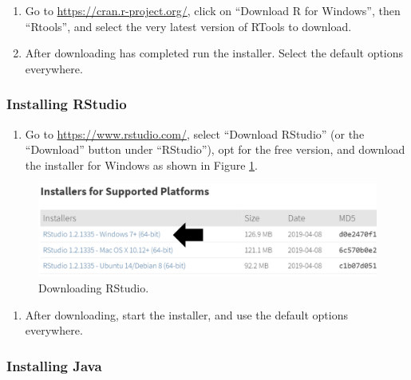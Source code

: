 \documentclass[11pt]{book}
\providecommand{\tightlist}{%
  \setlength{\itemsep}{0pt}\setlength{\parskip}{0pt}}
\theoremstyle{definition}
\theoremstyle{definition}
\theoremstyle{definition}
\theoremstyle{remark}
\begin{document}
\begin{enumerate}
\def\labelenumi{\arabic{enumi}.}
\item
  Go to \url{https://cran.r-project.org/}, click on ``Download R for
  Windows'', then ``Rtools'', and select the very latest version of
  RTools to download.
\item
  After downloading has completed run the installer. Select the default
  options everywhere.
\end{enumerate}

\subsubsection*{Installing RStudio}\label{installing-rstudio}

\begin{enumerate}
\def\labelenumi{\arabic{enumi}.}
\tightlist
\item
  Go to \url{https://www.rstudio.com/}, select ``Download RStudio'' (or
  the ``Download'' button under ``RStudio''), opt for the free version,
  and download the installer for Windows as shown in Figure
  \ref{fig:downloadRStudio}.
\end{enumerate}

\begin{figure}

{\centering \includegraphics[width=1\linewidth]{images/OhdsiAnalyticsTools/downloadRStudio} 

}

\caption{Downloading RStudio.}\label{fig:downloadRStudio}
\end{figure}

\begin{enumerate}
\def\labelenumi{\arabic{enumi}.}
\setcounter{enumi}{1}
\tightlist
\item
  After downloading, start the installer, and use the default options
  everywhere.
\end{enumerate}

\subsubsection*{Installing Java}\label{installing-java}
\end{document}
